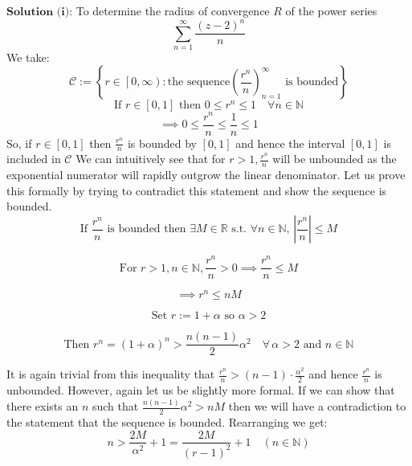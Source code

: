 \documentclass[12pt]{article}
\begin{document}
\noindent \(\textbf{Solution (i):}\) To determine the radius of convergence \(R\) of the power series
\[ \sum_{n=1}^{\infty} \frac{\left(z-2\right)^n}{n}\] 
We take:
\[
\mathscr{C} := \left\{ r \in \left[ 0, \infty \right) : \text{the sequence} \left( \frac{r^n}{n} \right)_{n=1}^{\infty} \text{ is bounded} \right\}
\]
\linebreak  
\[ \text{If }r \in \left[0,1\right] \text{ then } 0\leq r^n \leq 1 \quad \forall n\in\mathbb{N} \]
\[
\implies 0 \leq \frac{r^n}{n} \leq \frac{1}{n} \leq 1\]
\[\]
So, if \(r \in \left[0,1\right]\) then \(\frac{r^n}{n}\) is bounded by \(\left[0,1\right]\) and hence the interval \(\left[0,1\right]\) is included in \(\mathscr{C}\) \newline
\linebreak
\noindent We can intuitively see that for \(r > 1, \frac{r^n}{n}\) will be unbounded as the exponential numerator will rapidly outgrow the linear denominator. \newline
\linebreak
\noindent Let us prove this formally by trying to contradict this statement and show the sequence is bounded.
\[
\text{If } \frac{r^n}{n} \text{ is bounded then } \exists M \in \mathbb{R} \text{  s.t.  } \forall n \in \mathbb{N}, \, \left| \frac{r^n}{n} \right| \leq M
\]

\[
\text{For } r > 1, n \in \mathbb{N}, \frac{r^n}{n} > 0 \implies \frac{r^n}{n} \leq M 
\]

\[
\implies r^n \leq nM
\]

\[\text{Set } r := 1 + \alpha \text{ so }\alpha > 2\]



\[\text{Then }r^n = \left(1+\alpha\right)^n > \frac{n(n-1)}{2}\alpha^2 \quad \forall \, \alpha > 2 \text{ and }n \in \mathbb{N}\]

\noindent It is again trivial from this inequality that \(\frac{r^n}{n} > \left(n-1\right)\cdot\frac{\alpha^2}{2}\) and hence \(\frac{r^n}{n}\) is unbounded. However, again let us be slightly more formal. \newline
\linebreak
\noindent If we can show that there exists an \(n\) such that \(\frac{n(n-1)}{2}\alpha^2 > nM \) then we will have a contradiction to the statement that the sequence is bounded.\newline
\linebreak
Rearranging we get:
\[n > \frac{2M}{\alpha^2} + 1 = \frac{2M}{\left(r-1\right)^2} + 1 \quad \left(n \in \mathbb{N}\right)\]
\end{document}
